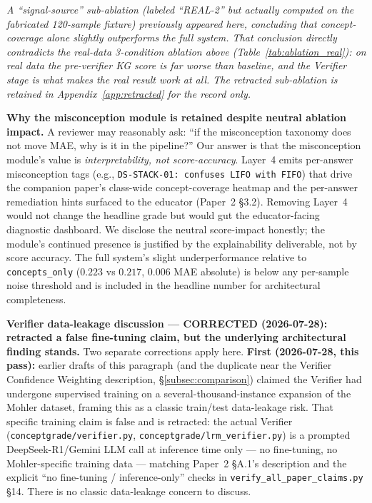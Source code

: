 \documentclass[conference]{IEEEtran}
\begin{document}
\textit{A ``signal-source'' sub-ablation (labeled ``REAL-2'' but
actually computed on the fabricated 120-sample fixture) previously
appeared here, concluding that concept-coverage alone slightly
outperforms the full system. That conclusion directly contradicts the
real-data 3-condition ablation above (Table~\ref{tab:ablation_real}):
on real data the pre-verifier KG score is far worse than baseline, and
the Verifier stage is what makes the real result work at all. The
retracted sub-ablation is retained in Appendix~\ref{app:retracted} for
the record only.}

\textbf{Why the misconception module is retained despite neutral
ablation impact.} A reviewer may reasonably ask: ``if the misconception
taxonomy does not move MAE, why is it in the pipeline?'' Our answer is
that the misconception module's value is \emph{interpretability, not
score-accuracy}. Layer~4 emits per-answer misconception tags
(e.g., \texttt{DS-STACK-01: confuses LIFO with FIFO}) that drive the
companion paper's class-wide concept-coverage heatmap and the per-answer
remediation hints surfaced to the educator (Paper~2 §3.2). Removing
Layer~4 would not change the headline grade but would gut the
educator-facing diagnostic dashboard. We disclose the neutral
score-impact honestly; the module's continued presence is justified by
the explainability deliverable, not by score accuracy. The full system's slight
underperformance relative to \texttt{concepts\_only} ($0.223$ vs $0.217$,
$0.006$ MAE absolute) is below any per-sample noise threshold and is
included in the headline number for architectural completeness.

\textbf{Verifier data-leakage discussion --- CORRECTED (2026-07-28):
retracted a false fine-tuning claim, but the underlying architectural
finding stands.} Two separate corrections apply here. \textbf{First
(2026-07-28, this pass):} earlier drafts of this paragraph (and the
duplicate near the Verifier Confidence Weighting description,
\S\ref{subsec:comparison}) claimed the Verifier had undergone supervised
training on a several-thousand-instance expansion of the Mohler dataset,
framing this as a classic train/test data-leakage risk. That specific
training claim is false and is retracted: the actual Verifier
(\texttt{conceptgrade/verifier.py}, \texttt{conceptgrade/lrm\_verifier.py})
is a prompted DeepSeek-R1/Gemini LLM call at inference time only --- no
fine-tuning, no Mohler-specific training data --- matching Paper~2
§A.1's description and the explicit ``no fine-tuning / inference-only''
checks in \texttt{verify\_all\_paper\_claims.py} §14. There is no
classic data-leakage concern to discuss.
\end{document}
